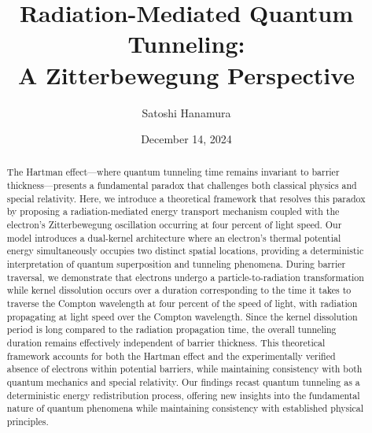 \documentclass[%
 reprint,
 amsmath,amssymb,
 aps,
]{revtex4-1}
\numberwithin{equation}{section}%
\begin{document}

\title{Radiation-Mediated Quantum Tunneling:\\A Zitterbewegung Perspective}
\author{Satoshi Hanamura}
    \date{December 14, 2024}


\begin{abstract}
The Hartman effect—where quantum tunneling time remains invariant to barrier thickness—presents a fundamental paradox that challenges both classical physics and special relativity. Here, we introduce a theoretical framework that resolves this paradox by proposing a radiation-mediated energy transport mechanism coupled with the electron's Zitterbewegung oscillation occurring at four percent of light speed. Our model introduces a dual-kernel architecture where an electron's thermal potential energy simultaneously occupies two distinct spatial locations, providing a deterministic interpretation of quantum superposition and tunneling phenomena. During barrier traversal, we demonstrate that electrons undergo a particle-to-radiation transformation while kernel dissolution occurs over a duration corresponding to the time it takes to traverse the Compton wavelength at four percent of the speed of light, with radiation propagating at light speed over the Compton wavelength. Since the kernel dissolution period is long compared to the radiation propagation time, the overall tunneling duration remains effectively independent of barrier thickness. This theoretical framework accounts for both the Hartman effect and the experimentally verified absence of electrons within potential barriers, while maintaining consistency with both quantum mechanics and special relativity. Our findings recast quantum tunneling as a deterministic energy redistribution process, offering new insights into the fundamental nature of quantum phenomena while maintaining consistency with established physical principles.
\end{abstract}


\maketitle
\end{document}
